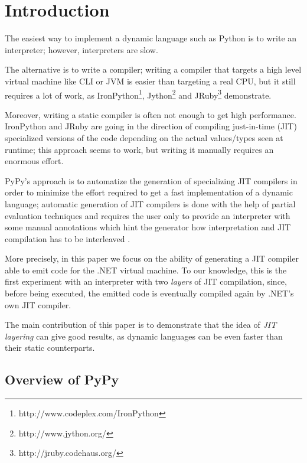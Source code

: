 \section{Introduction}
The easiest way to implement a dynamic language such as Python is to write an
interpreter; however, interpreters are slow.

The alternative is to write a compiler; writing a compiler that targets a high
level virtual machine like CLI or JVM is easier than targeting a real CPU, but
it still requires a lot of work, as
IronPython\footnote{http://www.codeplex.com/IronPython},
Jython\footnote{http://www.jython.org/}
and JRuby\footnote{http://jruby.codehaus.org/} demonstrate.

Moreover, writing a static compiler is often not enough to get high
performance.  IronPython and JRuby are going in the direction of
compiling just-in-time (JIT) specialized versions of the code depending
on the actual values/types seen at runtime; this approach seems to work,
but writing it manually requires an enormous effort.

PyPy's approach \cite{RiBo07_223} is to automatize the generation of 
specializing JIT compilers in order
to minimize the effort required to get a fast implementation of a
dynamic language; automatic generation of JIT compilers is done with
the help of partial evaluation techniques and requires the user only
to provide an interpreter with some manual annotations which hint
the generator how interpretation and JIT compilation has to be interleaved \cite{PyPyJIT09}.

More precisely, in this paper we focus on the ability of generating a JIT compiler able to emit code
for the .NET virtual machine. To our knowledge, this is the first experiment with an interpreter with
two \emph{layers} of JIT compilation, since, before being executed, the
emitted code is eventually compiled again by .NET's own JIT compiler.

The main contribution of this paper is to demonstrate that the idea of
\emph{JIT layering} can give good results, as dynamic languages can be even
faster than their static counterparts.


\subsection{Overview of PyPy}

